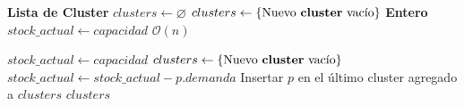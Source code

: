 \begin{algorithm}[H]
\caption{\Comment $\mathcal{O}(n)$}
\begin{algorithmic}[1]
	\State \textbf{Lista de Cluster} $clusters \gets \varnothing$
	\State $clusters \gets \{\text{Nuevo \textbf{cluster} vacío}\}$
	\State \textbf{Entero} $stock\_actual \gets capacidad$
	\Statex
	\Comment $\mathcal{O}(n)$
	
			\State $stock\_actual \gets capacidad$
			\State $clusters \gets \{\text{Nuevo \textbf{cluster} vacío}\}$
		\EndIf
		\Statex
		\State $stock\_actual \gets stock\_actual - p.demanda$
		\State Insertar $p$ en el último cluster agregado a $clusters$
	\EndFor
	\Statex
	\State \Return $clusters$
\EndFunction
\end{algorithmic}
\end{algorithm}